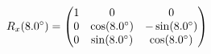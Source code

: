 \documentclass[preview]{standalone}
\begin{document}
\begin{align*}
\special{dvisvgm:raw <g id='unique000'>}R_x(8.0^\circ) = \begin{pmatrix} 1 & 0 & 0 \\ 0 & \cos(8.0^\circ) & -\sin(8.0^\circ) \\ 0 & \sin(8.0^\circ) & \cos(8.0^\circ) \end{pmatrix}\special{dvisvgm:raw </g>}
\end{align*}
\end{document}
